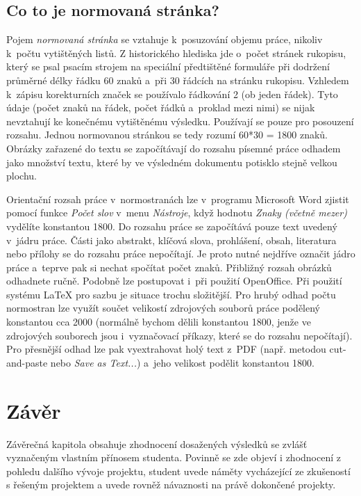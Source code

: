 \section{Co to je normovaná stránka?}
Pojem {\it normovaná stránka} se vztahuje k~posuzování objemu práce, nikoliv k~počtu vytištěných listů. Z historického hlediska jde o~počet stránek rukopisu, který se psal psacím strojem na speciální předtištěné formuláře při dodržení průměrné délky řádku 60 znaků a~při 30 řádcích na stránku rukopisu. Vzhledem k~zápisu korekturních značek se používalo řádkování 2 (ob jeden řádek). Tyto údaje (počet znaků na řádek, počet řádků a~proklad mezi nimi) se nijak nevztahují ke konečnému vytištěnému výsledku. Používají se pouze pro posouzení rozsahu. Jednou normovanou stránkou se tedy rozumí 60*30 = 1800 znaků. Obrázky zařazené do textu se započítávají do rozsahu písemné práce odhadem jako množství textu, které by ve výsledném dokumentu potisklo stejně velkou plochu.

Orientační rozsah práce v~normostranách lze v~programu Microsoft Word zjistit pomocí funkce {\it Počet slov} v~menu {\it Nástroje}, když hodnotu {\it Znaky (včetně mezer)} vydělíte konstantou 1800. Do rozsahu práce se započítává pouze text uvedený v~jádru práce. Části jako abstrakt, klíčová slova, prohlášení, obsah, literatura nebo přílohy se do rozsahu práce nepočítají. Je proto nutné nejdříve označit jádro práce a~teprve pak si nechat spočítat počet znaků. Přibližný rozsah obrázků odhadnete ručně. Podobně lze postupovat i~při použití OpenOffice. Při použití systému LaTeX pro sazbu je situace trochu složitější. Pro hrubý odhad počtu normostran lze využít součet velikostí zdrojových souborů práce podělený konstantou cca 2000 (normálně bychom dělili konstantou 1800, jenže ve zdrojových souborech jsou i~vyznačovací příkazy, které se do rozsahu nepočítají). Pro přesnější odhad lze pak vyextrahovat holý text z~PDF (např. metodou cut-and-paste nebo {\it Save as Text...}) a~jeho velikost podělit konstantou 1800. 


\chapter{Závěr}
Závěrečná kapitola obsahuje zhodnocení dosažených výsledků se zvlášť vyznačeným vlastním přínosem studenta. Povinně se zde objeví i zhodnocení z pohledu dalšího vývoje projektu, student uvede náměty vycházející ze zkušeností s řešeným projektem a uvede rovněž návaznosti na právě dokončené projekty.

